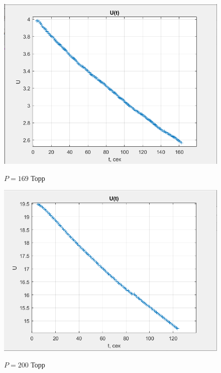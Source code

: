 \documentclass[a4paper, 12pt]{article} %
\begin{document}
\begin{figure}[h]
    \centering
    \includegraphics[width = 10.5 cm]{1gr169}
    \label{fig:vac}
    
    \begin{center}
		\caption{$P = 169$ Торр}
    \end{center}
\end{figure} 

\begin{figure}[h]
    \centering
    \includegraphics[width = 10.5 cm]{1gr200}
    \label{fig:vac}
    
    \begin{center}
		\caption{$P = 200$ Торр}
    \end{center}
\end{figure} 
\end{document}
